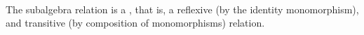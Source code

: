 \begin{code}%
\>[0]\<%
\\
\>[0]\AgdaSpace{}%
\AgdaSymbol{:}\AgdaSpace{}%
\AgdaSpace{}%
\AgdaSpace{}%
\AgdaSpace{}%
\AgdaSpace{}%
\AgdaSpace{}%
\AgdaSpace{}%
\AgdaSpace{}%
\AgdaSpace{}%
\AgdaSpace{}%
\AgdaSymbol{\AgdaUnderscore{}}\<%
\\
\>[0]\AgdaSpace{}%
\AgdaSpace{}%
\AgdaSpace{}%
\AgdaSymbol{=}\AgdaSpace{}%
\AgdaFunction{Σ[}\AgdaSpace{}%
\AgdaSpace{}%
\AgdaSpace{}%
\AgdaSpace{}%
\AgdaSpace{}%
\AgdaSpace{}%
\AgdaFunction{]}\AgdaSpace{}%
\AgdaSpace{}%
\AgdaSpace{}%
\AgdaSpace{}%
\<%
\\
\>[0]\<%
\end{code}
The subalgebra relation is a , that is, a reflexive (by the identity monomorphism), and
transitive (by composition of monomorphisms) relation.
